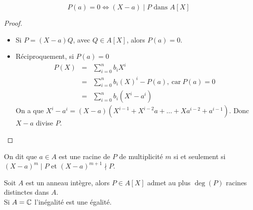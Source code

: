 \begin{prop}
	$$ P(a) = 0 \iff (X-a) \mid P \text{ dans } A[X]$$
\end{prop}

\begin{proof}
	\begin{itemize}
		\item Si $P = (X-a)Q$, avec $Q \in A[X]$, alors $P(a) = 0$.
		\item Réciproquement, si $P(a) = 0$
		      \begin{eqnarray*}
			      P(X) &=& \sum_{i=0}^n b_iX^i \\
			      &=& \sum_{i=0}^n b_i(X)^i  - P(a), \ \text{car}  \ P(a) = 0 \\
			      &=& \sum_{i=0}^n b_i(X^i-a^i)
		      \end{eqnarray*}
		      On a que $X^i - a^i = (X-a)(X^{i-1} + X^{i-2}a + \dots + Xa^{i-2} + a^{i-1})$. %
		      Donc $X-a$ divise $P$.
	\end{itemize}
\end{proof}

\begin{definition}
	On dit que $a \in A$ est une racine de $P$ de multiplicité $m$ si et seulement si $(X-a)^m \mid P$ et $(X-a)^{m+1} \nmid P$.
\end{definition}

\begin{prop}
	Soit $A$ est un anneau intègre, alors $P \in A[X]$ admet au plus $\deg(P)$ racines distinctes dans $A$.\\
	Si $A = \mathbb{C}$ l'inégalité est une égalité.
\end{prop}

